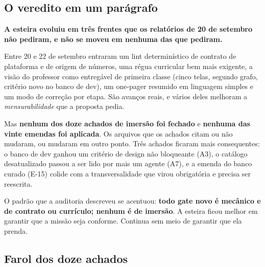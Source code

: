 \documentclass[11pt,a4paper]{article}
\begin{document}
\subsection{O veredito em um parágrafo}

\begin{tesebox}
\textbf{A esteira evoluiu em três frentes que os relatórios de 20 de setembro não pediram, e não
se moveu em nenhuma das que pediram.}

Entre 20 e 22 de setembro entraram um lint determinístico de contrato de plataforma e de origem
de números, uma régua curricular bem mais exigente, a visão do professor como entregável de
primeira classe (cinco telas, segundo grafo, critério novo no banco de dev), um one-pager resumido
em linguagem simples e um modo de correção por etapa. São avanços reais, e vários deles melhoram a
\emph{mensurabilidade} que a proposta pedia.

Mas \textbf{nenhum dos doze achados de imersão foi fechado} e \textbf{nenhuma das vinte emendas
foi aplicada}. Os arquivos que os achados citam ou não mudaram, ou mudaram em outro ponto. Três
achados ficaram mais consequentes: o banco de dev ganhou um critério de design não bloqueante
(A3), o catálogo desatualizado passou a ser lido por mais um agente (A7), e a emenda do banco
curado (E-15) colide com a transversalidade que virou obrigatória e precisa ser reescrita.

O padrão que a auditoria descreveu se acentuou: \textbf{todo gate novo é mecânico e de contrato ou
currículo; nenhum é de imersão}. A esteira ficou melhor em garantir que a missão seja conforme.
Continua sem meio de garantir que ela prenda.
\end{tesebox}

\subsection{Farol dos doze achados}
\end{document}

